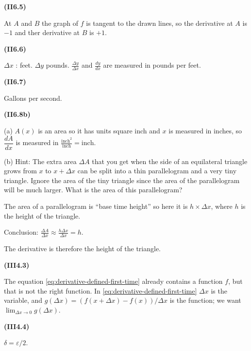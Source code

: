 \documentclass[openany,reqno]{amsbook}
\begin{document}
\begin{trivlist}
\item[{\bf(II6.5)}]

  At $A$ and $B$ the graph of $f$ is tangent to the drawn lines, so
  the derivative at $A$ is $-1$ and ther derivative at $B$ is $+1$.
  \bigskip

\item[{\bf(II6.6)}]

  $\Delta x$ : feet.  $\Delta y$ pounds. $\frac{\Delta y}{\Delta x}$
  and $\frac{dy}{dx}$ are measured in pounds per feet.
  \bigskip

\item[{\bf(II6.7)}]

  Gallons per second.
  \bigskip

\item[{\bf(II6.8b)}]

  (a) $A(x)$ is an area so it has units square inch and $x$ is
  measured in inches, so $\dfrac{dA}{dx}$ is measured in
  $\displaystyle\frac{\text{inch}^2}{\text{inch}} = \text{inch}$.

  


  (b) Hint: The extra area $\Delta A$ that you get when the side of
  an equilateral triangle grows from $x$ to $x+\Delta x$ can be
  split into a thin parallelogram and a very tiny triangle.  Ignore
  the area of the tiny triangle since the area of the parallelogram
  will be much larger.  What is the area of this parallelogram?

  The area of a parallelogram is ``base time height'' so here it is
  $h\times\Delta x$, where $h$ is the height of the triangle.

  Conclusion: $\displaystyle \frac{\Delta A}{\Delta x}
  \approx\frac{h\Delta x}{\Delta x} = h$.

  The derivative is therefore the height of the triangle.

  \bigskip

\item[{\bf(III4.3)}]

  The equation \eqref{eq:derivative-defined-first-time} already
  contains a function $f$, but that is not the right function.  In
  \eqref{eq:derivative-defined-first-time} $\Delta x$ is the variable,
  and $g(\Delta x) = (f(x+\Delta x)-f(x))/\Delta x$ is the function; we
  want $\lim_{\Delta x\to 0}g(\Delta x)$.
  \bigskip

\item[{\bf(III4.4)}]

  $\delta = \varepsilon/2$.
  \bigskip


\end{trivlist}
\end{document}
